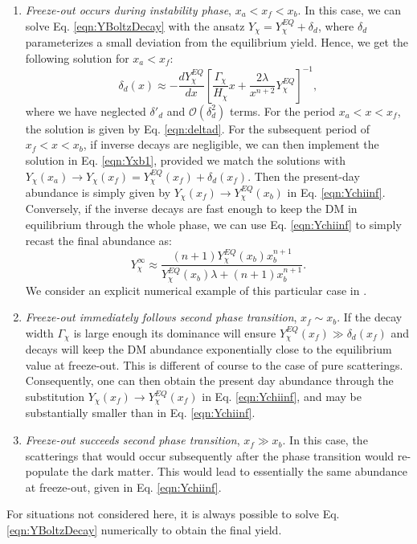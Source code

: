 \begin{enumerate}[label=(\arabic*)]
\item \textit{Freeze-out occurs during instability phase}, $x_a < x_f < x_b$. In this case, we can solve Eq. \ref{eqn:YBoltzDecay} with the ansatz $Y_{\chi}=Y_{\chi}^{EQ} + \delta_d$, where $\delta_d$ parameterizes a small deviation from the equilibrium yield. Hence, we get the following solution for $x_a < x_f$:
\begin{equation}
\delta_d (x) \approx -\frac{dY_{\chi}^{EQ}}{dx}\left[\frac{\Gamma_{\chi}}{H_{\chi}}x+\frac{2\lambda}{x^{n+2}}	Y_{\chi}^{EQ} \right]^{-1},
\label{eqn:deltad}
\end{equation}
where we have neglected $\delta'_d$ and $\mathcal{O}(\delta_d^2)$ terms. For the period $x_a < x < x_f$, the solution is given by Eq. \ref{eqn:deltad}. For the subsequent period of $x_f < x < x_b$, if inverse decays are negligible, we can then implement the solution in Eq. \ref{eqn:Yxb1}, provided we match the solutions with $Y_{\chi}(x_a) \rightarrow Y_{\chi}(x_f) = Y^{EQ}_{\chi}(x_f)+\delta_d (x_f)$. Then the present-day abundance is simply given by $Y_{\chi}(x_f) \rightarrow Y^{EQ}_{\chi}(x_b)$ in Eq. \ref{eqn:Ychiinf}. Conversely, if the inverse decays are fast enough to keep the DM in equilibrium through the whole phase, we can use Eq. \ref{eqn:Ychiinf} to simply recast the final abundance as:
\begin{equation}
Y^{\infty}_{\chi} \approx \frac{(n+1)Y^{EQ}_{\chi}(x_b)x^{n+1}_b}{Y^{EQ}_{\chi}(x_b)\lambda + (n+1)x^{n+1}_b}.
\label{eqn:Yxbinf}
\end{equation}
We consider an explicit numerical example of this particular case in \cite{RN802}.
\item \textit{Freeze-out immediately follows second phase transition}, $x_f \sim x_b$. If the decay width $\Gamma_{\chi }$ is large enough its dominance will ensure $Y^{EQ}_{\chi}(x_f) \gg \delta_d (x_f)$ and decays will keep the DM abundance exponentially close to the equilibrium value at freeze-out. This is different of course to the case of pure scatterings. Consequently, one can then obtain the present day abundance through the substitution $Y_{\chi}(x_f) \rightarrow Y^{EQ}_{\chi}(x_f)$ in Eq. \ref{eqn:Ychiinf}, and may be substantially smaller than in Eq. \ref{eqn:Ychiinf}.

\item \textit{Freeze-out succeeds second phase transition}, $x_f \gg x_b$. In this case, the scatterings that would occur subsequently after the phase transition would re-populate the dark matter. This would lead to essentially the same abundance at freeze-out, given in Eq. \ref{eqn:Ychiinf}.
\end{enumerate}
For situations not considered here, it is always possible to solve Eq. \ref{eqn:YBoltzDecay} numerically to obtain the final yield.

